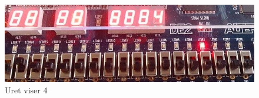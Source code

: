 \begin{enumerate}
		\begin{figure}[h]
			\centering
			\includegraphics[scale=0.8]{pictures/Oevelse6/opg1/watch4.JPG}
			\caption{Uret viser 4}
			\label{fig:alarm4}
		\end{figure}


\end{enumerate}